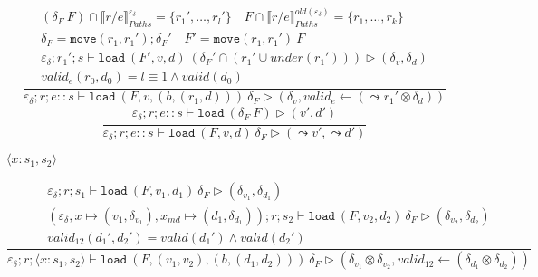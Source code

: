 \documentclass{report}
\theoremstyle{theorem}
\begin{document}
\begin{displaymath}
	\frac{\begin{array}{c}
		(\delta_F~F) \cap \llbracket r/e \rrbracket^{\varepsilon_\delta}_{Paths} = \{r_1',\dots,r_l'\} \quad
		F \cap \llbracket r/e \rrbracket^{old(\varepsilon_\delta)}_{Paths} = \{r_1,\dots,r_k\} \\
		\delta_F = \mathtt{move}(r_1,r_1') ; \delta_F' \quad F' = \mathtt{move}(r_1,r_1')~F \\
		\varepsilon_\delta ; r_1' ; s \vdash \mathtt{load}~ (F',v,d)~ (\delta_F' \cap (r_1' \cup under(r_1'))) \rhd (\delta_v,\delta_d)\\
		valid_{e} (r_0,d_0) = l \equiv 1 \wedge valid(d_0)
	\end{array}}
	{\varepsilon_\delta ; r ; e::s \vdash \mathtt{load}~ (F,v,(b,(r_1,d)))~ \delta_F \rhd (\delta_v,valid_{e} \leftarrow (\leadsto r_1' \otimes \delta_d))}
\end{displaymath}
\begin{displaymath}
	\frac{\begin{array}{c}
		\varepsilon_\delta;r;e :: s \vdash \mathtt{load}~ (\delta_F~F) \rhd (v',d')
	\end{array}}
	{\varepsilon_\delta ; r ; e::s \vdash \mathtt{load}~ (F,v,d)~ \delta_F \rhd (\leadsto v',\leadsto d')}
\end{displaymath}

$\boxed{\langle x : s_1, s_2 \rangle}$

\begin{displaymath}
	\frac{\begin{array}{c}
		\varepsilon_\delta ; r ; s_1 \vdash \mathtt{load}~ (F,v_1,d_1)~ \delta_F \rhd (\delta_{v_1},\delta_{d_1})\\
		(\varepsilon_\delta,x \mapsto (v_1,\delta_{v_1}),x_{md} \mapsto (d_1,\delta_{d_1})) ; r ; s_2 \vdash \mathtt{load}~ (F,v_2,d_2)~ \delta_F \rhd (\delta_{v_2},\delta_{d_2})\\
		valid_{12}({d_1}',{d_2}') = valid({d_1}') \wedge valid({d_2}')
	\end{array}}
	{\varepsilon_\delta ; r ; \langle x:s_1,s_2 \rangle \vdash \mathtt{load}~ (F,(v_1,v_2),(b,(d_1,d_2)))~ \delta_F \rhd (\delta_{v_1} \otimes \delta_{v_2},valid_{12} \leftarrow (\delta_{d_1} \otimes \delta_{d_2})) }
\end{displaymath}
\end{document}

